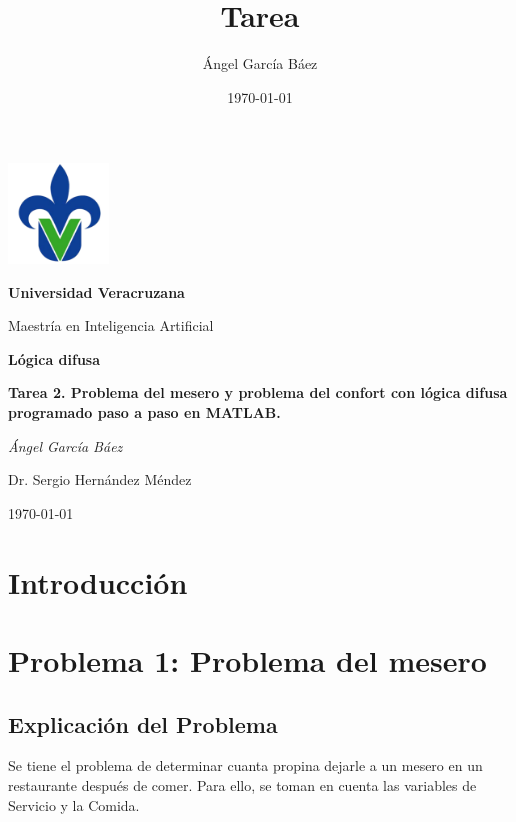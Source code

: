 \documentclass[11pt, letterpaper]{article}
\title{\bfseries Tarea}
\author{Ángel García Báez}
\date{\today}
\begin{document}
	
	\begin{titlepage}
		\centering
		\includegraphics[width=0.2\textwidth]{logo.png}\par
		\vspace{1cm}
		{\LARGE \bfseries Universidad Veracruzana \par}
		\vspace{1cm}
		{\Large Maestría en Inteligencia Artificial\par}
		\vspace{3cm}
		{\LARGE \bfseries Lógica difusa \par}
		\vspace{1cm}
		{\Large \bfseries Tarea 2. Problema del mesero y problema del confort con lógica difusa programado paso a paso en MATLAB. \par}
		\vfill
		{\Large \textit{Ángel García Báez}\par}
		\vfill
		{\Large Dr. Sergio Hernández Méndez \par}
		\vfill
		{\Large \today \par}
	\end{titlepage}
	
	\newpage
	\tableofcontents
	\newpage
	
	
	\section{Introducción}
	
	
	\newpage
	
	
	
	\section{Problema 1: Problema del mesero}
	
	\subsection{Explicación del Problema}
	
	Se tiene el problema de determinar cuanta propina dejarle a un mesero en un restaurante después de comer. Para ello, se toman en cuenta las variables de Servicio y la Comida.
	
\end{document}
